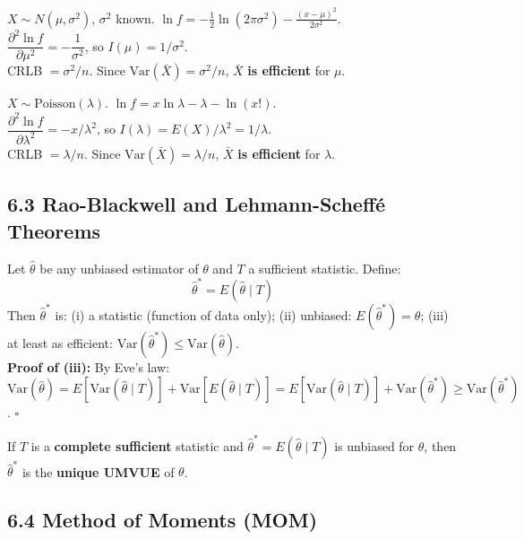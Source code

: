\documentclass[12pt]{article}
\begin{document}
\begin{examplebox}
$X\sim N(\mu,\sigma^2)$, $\sigma^2$ known. $\ln f=-\frac{1}{2}\ln(2\pi\sigma^2)-\frac{(x-\mu)^2}{2\sigma^2}$.\\[4pt]
$\dfrac{\partial^2\ln f}{\partial\mu^2}=-\dfrac{1}{\sigma^2}$, so $I(\mu)=1/\sigma^2$.\\[4pt]
CRLB $=\sigma^2/n$. Since $\text{Var}(\bar X)=\sigma^2/n$, $\bar X$ \textbf{is efficient} for $\mu$.
\end{examplebox}

\begin{examplebox}
$X\sim\text{Poisson}(\lambda)$. $\ln f=x\ln\lambda-\lambda-\ln(x!)$.\\[4pt]
$\dfrac{\partial^2\ln f}{\partial\lambda^2}=-x/\lambda^2$, so $I(\lambda)=E(X)/\lambda^2=1/\lambda$.\\[4pt]
CRLB $=\lambda/n$. Since $\text{Var}(\bar X)=\lambda/n$, $\bar X$ \textbf{is efficient} for $\lambda$.
\end{examplebox}

\subsection{6.3 Rao-Blackwell and Lehmann-Scheff\'e Theorems}

\begin{thmbox}
Let $\hat\theta$ be any unbiased estimator of $\theta$ and $T$ a sufficient statistic. Define:
\[\hat\theta^*=E(\hat\theta\mid T)\]
Then $\hat\theta^*$ is: (i) a statistic (function of data only); (ii) unbiased: $E(\hat\theta^*)=\theta$; (iii) at least as efficient: $\text{Var}(\hat\theta^*)\leq\text{Var}(\hat\theta)$.\\[4pt]
\textbf{Proof of (iii):} By Eve's law: $\text{Var}(\hat\theta)=E[\text{Var}(\hat\theta\mid T)]+\text{Var}[E(\hat\theta\mid T)]=E[\text{Var}(\hat\theta\mid T)]+\text{Var}(\hat\theta^*)\geq\text{Var}(\hat\theta^*)$. \hfill$\square$
\end{thmbox}

\begin{thmbox}
If $T$ is a \textbf{complete sufficient} statistic and $\hat\theta^*=E(\hat\theta\mid T)$ is unbiased for $\theta$, then $\hat\theta^*$ is the \textbf{unique UMVUE} of $\theta$.
\end{thmbox}

\subsection{6.4 Method of Moments (MOM)}
\end{document}
